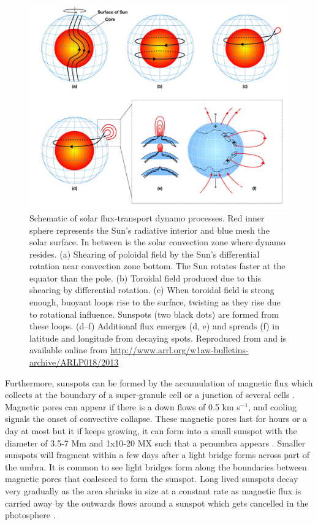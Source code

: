 	\begin{figure}
		\centering
		\includegraphics[width=\textwidth]{dynamo.pdf}
		\caption{
			Schematic of solar flux-transport dynamo processes. Red inner sphere represents the Sun's radiative interior and blue mesh the solar surface. In between is the solar convection zone where dynamo resides. (a) Shearing of poloidal field by the Sun's differential rotation near convection zone bottom. The Sun rotates faster at the equator than the pole. (b) Toroidal field produced due to this shearing by differential rotation. (c) When toroidal field is strong enough, buoyant loops rise to the surface, twisting as they rise due to rotational influence. Sunspots (two black dots) are formed from these loops. (d--f) Additional flux emerges (d, e) and spreads (f) in latitude and longitude from decaying spots.
			Reproduced from \cite{1367-2630-9-8-297} and is available online from \url{http://www.arrl.org/w1aw-bulletins-archive/ARLP018/2013}
		}
		\label{fig:dynamo_field}
	\end{figure}
    
    Furthermore, sunspots can be formed by the accumulation of magnetic flux which collects at the boundary of a super-granule cell or a junction of several cells \cite{1974MNRAS.169...35M}.
    Magnetic pores can appear if there is a down flows of 0.5 km s$^{-1}$, and cooling signals the onset of convective collapse.
    These magnetic pores last for hours or a day at most but it if keeps growing, it can form into a small sunspot with the diameter of 3.5-7 Mm and 1x10-20 MX such that a penumbra appears \citep{2010A&A...512L...1S}.
    Smaller sunspots will fragment within a few days after a light bridge forms across part of the umbra.
    It is common to see light bridges form along the boundaries between magnetic pores that coalesced to form the sunspot.
    Long lived sunspots decay very gradually as the area shrinks in size at a constant rate as magnetic flux is carried away by the outwards flows around a sunspot which gets cancelled in the photosphere \citep{2002AN....323..342M,2008ApJ...686.1447K}.
                          
